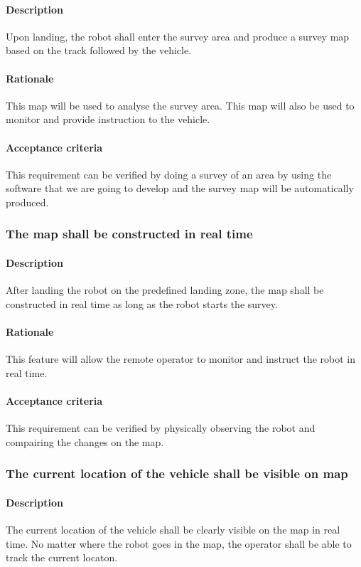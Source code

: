 \documentclass[10pt,a4paper,titlepage]{article}
\begin{document}
    \paragraph{Description}   Upon landing, the robot shall enter the survey area and produce a survey map based on the track followed by the vehicle.
    \paragraph{Rationale}   This map will be used to analyse the survey area. This map will also be used to monitor and provide instruction to the vehicle.
    \paragraph{Acceptance criteria}   This requirement can be verified by doing a survey of an area  by using the software that we are going to develop and the survey map will be automatically produced.
    \subsubsection{The map shall be constructed in real time}
     \paragraph{Description}   After landing the robot on the predefined landing zone, the map shall be constructed in real time as long as the robot starts the survey.
    \paragraph{Rationale}   This feature will allow the remote operator to monitor and instruct the robot in real time.
    \paragraph{Acceptance criteria}   This requirement can be verified by physically observing the robot and compairing the changes on the map.
    \subsubsection{The current location of the vehicle shall be visible on map}
     \paragraph{Description}   The current location of the vehicle shall be clearly visible on the map in real time. No matter where the robot goes in the map, the operator shall be able to track the current locaton.
\end{document}
